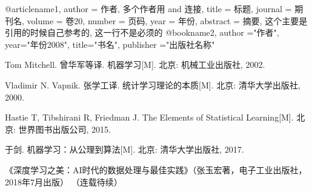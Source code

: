 \bibitem

@article{name1,
author = {作者, 多个作者用 and 连接},
title = {标题},
journal = {期刊名},
volume = {卷20},
number = {页码},
year = {年份},
abstract = {摘要, 这个主要是引用的时候自己参考的, 这一行不是必须的}
}
@book{name2,
author ="作者",
year="年份2008",
title="书名",
publisher ="出版社名称"
}



Tom Mitchell. 曾华军等译. 机器学习[M]. 北京: 机械工业出版社, 2002.

\bibitem Vladimir N. Vapnik. 张学工译. 统计学习理论的本质[M]. 北京: 清华大学出版社, 2000.

\bibitem Hastie T, Tibshirani R, Friedman J. The Elements of Statistical Learning[M]. 北京: 世界图书出版公司, 2015.

\bibitem 于剑. 机器学习：从公理到算法[M]. 北京: 清华大学出版社, 2017.

\bibitem

《深度学习之美：AI时代的数据处理与最佳实践》（张玉宏著，电子工业出版社，2018年7月出版）
（连载待续）

